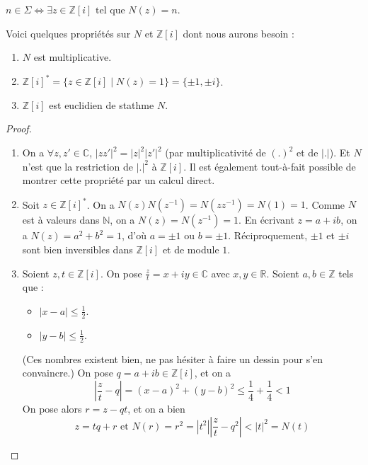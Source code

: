   \begin{remark}
    \label{theoreme-des-deux-carres-fermat-2}
    $n \in \Sigma \iff \exists z \in \mathbb{Z}[i] \text{ tel que } N(z)=n$.
  \end{remark}

  \begin{lemma}
    \label{theoreme-des-deux-carres-fermat-3}
    Voici quelques propriétés sur $N$ et $\mathbb{Z}[i]$ dont nous aurons besoin :
    \begin{enumerate}[label=(\roman*)]
      \item $N$ est multiplicative.
      \item $\mathbb{Z}[i]^* = \{ z \in \mathbb{Z}[i] \mid N(z) = 1 \} = \{ \pm 1, \pm i \}$.
      \item $\mathbb{Z}[i]$ est euclidien de stathme $N$.
    \end{enumerate}
  \end{lemma}

  \begin{proof}
    \begin{enumerate}[label=(\roman*)]
      \item On a $\forall z, z' \in \mathbb{C}$, $|zz'|^2 = |z|^2 |z'|^2$ (par multiplicativité de $(.)^2$ et de $|.|$). Et $N$ n'est que la restriction de $|.|^2$ à $\mathbb{Z}[i]$. Il est également tout-à-fait possible de montrer cette propriété par un calcul direct.
      \item Soit $z \in \mathbb{Z}[i]^*$. On a $N(z)N(z^{-1}) = N(zz^{-1}) = N(1) = 1$. Comme $N$ est à valeurs dans $\mathbb{N}$, on a $N(z) = N(z^{-1}) = 1$. En écrivant $z = a+ib$, on a $N(z) = a^2 + b^2 = 1$, d'où $a = \pm 1$ ou $b = \pm 1$. Réciproquement, $\pm 1$ et $\pm i$ sont bien inversibles dans $\mathbb{Z}[i]$ et de module $1$.
      \item Soient $z, t \in \mathbb{Z}[i]$. On pose $\frac{z}{t} = x + iy \in \mathbb{C}$ avec $x, y \in \mathbb{R}$. Soient $a, b \in \mathbb{Z}$ tels que :
      \begin{itemize}
        \item $|x-a| \leq \frac{1}{2}$.
        \item $|y-b| \leq \frac{1}{2}$.
      \end{itemize}
      (Ces nombres existent bien, ne pas hésiter à faire un dessin pour s'en convaincre.) On pose $q = a+ib \in \mathbb{Z}[i]$, et on a
      \[ \left| \frac{z}{t} - q \right| = (x-a)^2 + (y-b)^2 \leq \frac{1}{4} + \frac{1}{4} < 1 \]
      On pose alors $r = z-qt$, et on a bien
      \[ z = tq+r \text{ et } N(r) = r^2 = |t^2| \left| \frac{z}{t} - q^2 \right| < |t|^2 = N(t) \]
    \end{enumerate}
  \end{proof}

